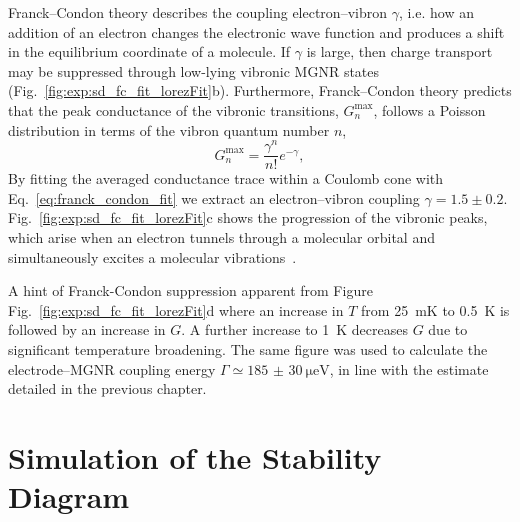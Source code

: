 Franck--Condon theory describes the coupling electron--vibron $\gamma$, i.e. how an addition of an electron changes the electronic wave function and produces a shift in the equilibrium coordinate of a molecule. If $\gamma$ is large, then charge transport may be suppressed through low-lying vibronic MGNR states (Fig.~\ref{fig:exp:sd_fc_fit_lorezFit}b). Furthermore, Franck--Condon theory predicts that the peak conductance of the vibronic transitions, $G_n^{\max }$, follows a Poisson distribution in terms of the vibron quantum number $n$,
%
\begin{equation}\label{eq:franck_condon_fit}
    G_n^{\max }=\frac{\gamma^n}{n !} e^{-\gamma},
\end{equation}
%    
By fitting the averaged conductance trace within a Coulomb cone with Eq.~\ref{eq:franck_condon_fit} we extract an electron--vibron coupling $\gamma=1.5 \pm 0.2$. Fig.~\ref{fig:exp:sd_fc_fit_lorezFit}c shows the progression of the vibronic peaks, which arise when an electron tunnels through a molecular orbital and simultaneously excites a molecular vibrations~\cite{van2013suppression}.

A hint of Franck-Condon suppression apparent from Figure Fig.~\ref{fig:exp:sd_fc_fit_lorezFit}d where an increase in $T$ from \SI{25}{\milli\kelvin} to \SI{0.5}{\kelvin} is followed by an increase in $G$. A further increase to \SI{1}{\kelvin} decreases $G$ due to significant temperature broadening. The same figure was used to calculate the electrode--\gls{MGNR} coupling energy $\Gamma\simeq\SI[separate-uncertainty = true]{185(30)}{\micro\electronvolt}$, in line with the estimate detailed in the previous chapter.



\section{Simulation of the Stability Diagram}\label{solubility:sec:simulation}

